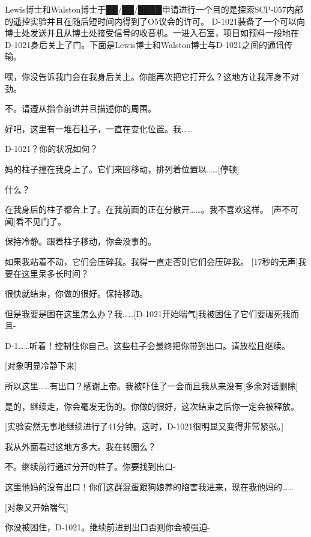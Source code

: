 Lewis博士和Walston博士于██\slash ██\slash ████申请进行一个目的是探索SCP-057内部的遥控实验并且在随后短时间内得到了O5议会的许可。 D-1021装备了一个可以向博士处发送并且从博士处接受信号的收音机。一进入石室，项目如预料一般地在D-1021身后关上了门。下面是Lewis博士和Walston博士与D-1021之间的通讯传输。

\begin{scpbox}

嘿，你没告诉我门会在我身后关上。你能再次把它打开么？这地方让我浑身不对劲。

不。请遵从指令前进并且描述你的周围。

好吧，这里有一堆石柱子，一直在变化位置。我……

D-1021？你的状况如何？

妈的柱子撞在我身上了。它们来回移动，排列着位置以……{[}停顿]

什么？

在我身后的柱子都合上了。在我前面的正在分散开……。我不喜欢这样。 {[}声不可闻]看不见门了。

保持冷静。跟着柱子移动，你会没事的。

如果我站着不动，它们会压碎我。我得一直走否则它们会压碎我。 {[}17秒的无声]我要在这里呆多长时间？

很快就结束，你做的很好。保持移动。

但是我要是困在这里怎么办？我……{[}D-1021开始喘气]我被困住了它们要碾死我而且-

D-1……听着！控制住你自己。这些柱子会最终把你带到出口。请放松且继续。

{[}对象明显冷静下来]

所以这里……有出口？感谢上帝。我被吓住了一会而且我从来没有{[}多余对话删除]

是的，继续走，你会毫发无伤的。你做的很好，这次结束之后你一定会被释放。

{[}实验安然无事地继续进行了41分钟。这时，D-1021很明显又变得非常紧张。]

我从外面看过这地方多大。我在转圈么？

不。继续前行通过分开的柱子。你要找到出口-

这里他妈的没有出口！你们这群混蛋跟狗娘养的陷害我进来，现在我他妈的……

{[}对象又开始喘气]

你没被困住，D-1021。继续前进到出口否则你会被强迫-


\end{scpbox}

